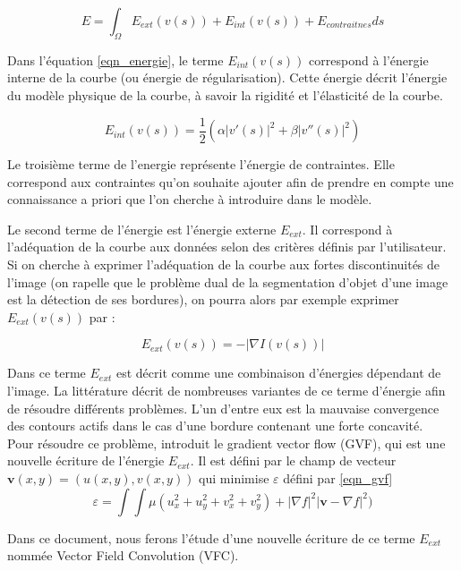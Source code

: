 \begin{equation}
E = \int_{\Omega}{E_{ext}(v(s)) + E_{int}(v(s)) + E_{contraitnes} ds}
\label{eqn_energie}
\end{equation}

Dans l'équation \ref{eqn_energie}, le terme $E_{int}(v(s))$ correspond à l'énergie interne de la courbe (ou énergie de régularisation). Cette énergie décrit l'énergie du modèle physique de la courbe, à savoir la rigidité et l'élasticité de la courbe.

\begin{equation}
E_{int}(v(s)) = \frac{1}{2}\left(\alpha|v'(s)|^{2}+\beta|v''(s)|^{2}\right)
\end{equation}

Le troisième terme de l'energie représente l'énergie de contraintes. Elle correspond aux contraintes qu'on souhaite ajouter afin de prendre en compte une connaissance a priori que l'on cherche à introduire dans le modèle.

Le second terme de l'énergie est l'énergie externe $E_{ext}$. Il correspond à l'adéquation de la courbe aux données selon des critères définis par l'utilisateur. Si on cherche à exprimer l'adéquation de la courbe aux fortes discontinuités de l'image (on rapelle que le problème dual de la segmentation d'objet d'une image est la détection de ses bordures), on pourra alors par exemple exprimer $E_{ext}(v(s))$ par :

\begin{equation}
E_{ext}(v(s)) = -|\nabla I(v(s))|
\end{equation}

Dans \cite{kaas} ce terme $E_{ext}$ est décrit comme une combinaison d'énergies dépendant de l'image. La littérature décrit de nombreuses variantes de ce terme d'énergie afin de résoudre différents problèmes. L'un d'entre eux est la mauvaise convergence des contours actifs dans le cas d'une bordure contenant une forte concavité.\\

Pour résoudre ce problème, \cite{gvf} introduit le gradient vector flow (GVF), qui est une nouvelle écriture de l'énergie $E_{ext}$. Il est défini par le champ de vecteur $\textbf{v}(x,y) = (u(x,y), v(x,y))$ qui minimise $\varepsilon$ défini par \ref{eqn_gvf}
\begin{equation}
\varepsilon = \int\int \mu(u_{x}^{2}+u_{y}^{2}+v_{x}^{2}+v_{y}^{2})+|\nabla f|^{2}|\textbf{v}-\nabla f|^{2})
\label{eqn_gvf}
\end{equation}

Dans ce document, nous ferons l'étude d'une nouvelle écriture de ce terme $E_{ext}$ nommée Vector Field Convolution (VFC).
